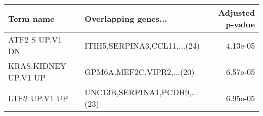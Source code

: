 \begin{tabular}{llr}
\toprule
           Term name &          Overlapping genes... &  Adjusted p-value \\
\midrule
     ATF2 S UP.V1 DN &  ITIH5,SERPINA3,CCL11,...(24) &          4.13e-05 \\
KRAS.KIDNEY UP.V1 UP &     GPM6A,MEF2C,VIPR2,...(20) &          6.57e-05 \\
       LTE2 UP.V1 UP & UNC13B,SERPINA1,PCDH9,...(23) &          6.95e-05 \\
\bottomrule
\end{tabular}
